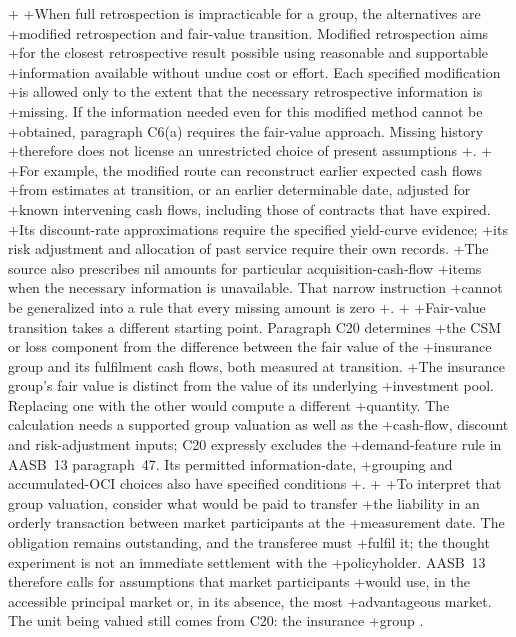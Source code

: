 +
+When full retrospection is impracticable for a group, the alternatives are
+modified retrospection and fair-value transition. Modified retrospection aims
+for the closest retrospective result possible using reasonable and supportable
+information available without undue cost or effort. Each specified modification
+is allowed only to the extent that the necessary retrospective information is
+missing. If the information needed even for this modified method cannot be
+obtained, paragraph C6(a) requires the fair-value approach. Missing history
+therefore does not license an unrestricted choice of present assumptions
+\citep[paragraphs C5--C8]{aasb17}.
+
+For example, the modified route can reconstruct earlier expected cash flows
+from estimates at transition, or an earlier determinable date, adjusted for
+known intervening cash flows, including those of contracts that have expired.
+Its discount-rate approximations require the specified yield-curve evidence;
+its risk adjustment and allocation of past service require their own records.
+The source also prescribes nil amounts for particular acquisition-cash-flow
+items when the necessary information is unavailable. That narrow instruction
+cannot be generalized into a rule that every missing amount is zero
+\citep[paragraphs C12--C16]{aasb17}.
+
+Fair-value transition takes a different starting point. Paragraph C20 determines
+the CSM or loss component from the difference between the fair value of the
+insurance group and its fulfilment cash flows, both measured at transition.
+The insurance group's fair value is distinct from the value of its underlying
+investment pool. Replacing one with the other would compute a different
+quantity. The calculation needs a supported group valuation as well as the
+cash-flow, discount and risk-adjustment inputs; C20 expressly excludes the
+demand-feature rule in AASB~13 paragraph~47. Its permitted information-date,
+grouping and accumulated-OCI choices also have specified conditions
+\citep[paragraphs C20--C24B]{aasb17}.
+
+To interpret that group valuation, consider what would be paid to transfer
+the liability in an orderly transaction between market participants at the
+measurement date. The obligation remains outstanding, and the transferee must
+fulfil it; the thought experiment is not an immediate settlement with the
+policyholder. AASB~13 therefore calls for assumptions that market participants
+would use, in the accessible principal market or, in its absence, the most
+advantageous market. The unit being valued still comes from C20: the insurance
+group \citep[paragraphs~2--3, 9, 13--24 and 34]{aasb13comp2021}.

